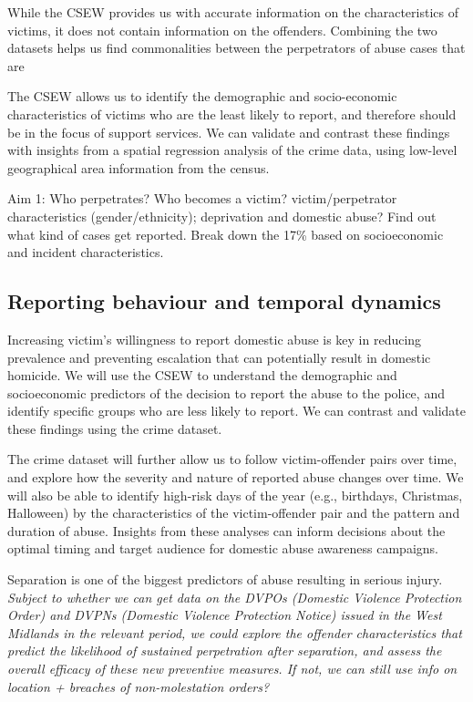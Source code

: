 \documentclass[12pt, letterpaper]{article}
\begin{document}
While the CSEW provides us with accurate information on the characteristics of victims, it does not contain information on the offenders. Combining the two datasets helps us find commonalities between the perpetrators of abuse cases that are 


The CSEW allows us to identify the demographic and socio-economic characteristics of victims who are the least likely to report, and therefore should be in the focus of support services. We can validate and contrast these findings with insights from a spatial regression analysis of the crime data, using low-level geographical area information from the census. 



Aim 1: Who perpetrates? Who becomes a victim? victim/perpetrator characteristics (gender/ethnicity); deprivation and domestic abuse? Find out what kind of cases get reported. Break down the 17\% based on socioeconomic and incident characteristics.


\subsection{Reporting behaviour and temporal dynamics}

Increasing victim's willingness to report domestic abuse is key in reducing prevalence and preventing escalation that can potentially result in domestic homicide. We will use the CSEW to understand the demographic and socioeconomic predictors of the decision to report the abuse to the police, and identify specific groups who are less likely to report. We can contrast and validate these findings using the crime dataset.


The crime dataset will further allow us to follow victim-offender pairs over time, and explore how the severity and nature of reported abuse changes over time. We will also be able to identify high-risk days of the year (e.g., birthdays, Christmas, Halloween) by the characteristics of the victim-offender pair and the pattern and duration of abuse. Insights from these analyses can inform decisions about the optimal timing and target audience for domestic abuse awareness campaigns. 

Separation is one of the biggest predictors of abuse resulting in serious injury. \textit{Subject to whether we can get data on the DVPOs (Domestic Violence Protection Order) and DVPNs (Domestic Violence Protection Notice) issued in the West Midlands in the relevant period, we could explore the offender characteristics that predict the likelihood of sustained perpetration after separation, and assess the overall efficacy of these new preventive measures. If not, we can still use info on location + breaches of non-molestation orders?}
\end{document}
